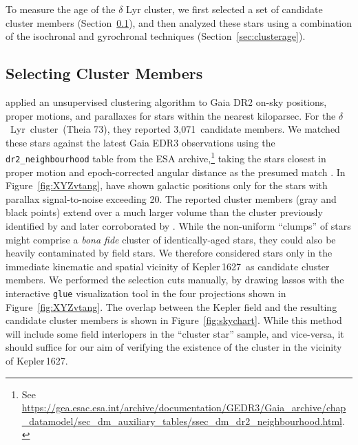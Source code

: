 \documentclass[12pt,modern,twocolumn,tighten]{aastex63}
\newcommand{\cn}{$\delta$\ Lyr\ cluster} %
\newcommand{\sn}{Kepler\,1627} %
\newcommand{\noriginal}{3{,}071} %
\begin{document}
To measure the age of the $\delta$ Lyr cluster, we first selected a
set of candidate cluster members
(Section~\ref{sec:kinematicselection}), and then analyzed these stars
using a combination of the isochronal and gyrochronal techniques
(Section~\ref{sec:clusterage}).


\subsection{Selecting Cluster Members}
\label{sec:kinematicselection}

\citet{KounkelCovey2019} applied an unsupervised clustering algorithm
to Gaia DR2 on-sky positions, proper motions, and parallaxes for stars
within the nearest kiloparsec.  For the \cn\ (Theia 73), they reported
\noriginal\ candidate members.  We matched these stars against the
latest Gaia EDR3 observations using the \texttt{dr2\_neighbourhood}
table from the ESA archive,\footnote{See
\url{https://gea.esac.esa.int/archive/documentation/GEDR3/Gaia_archive/chap_datamodel/sec_dm_auxiliary_tables/ssec_dm_dr2_neighbourhood.html}.}
taking the stars closest in proper motion and epoch-corrected angular
distance as the presumed match \citep{gaia_collaboration_2021_edr3}.
In Figure~\ref{fig:XYZvtang}, have shown galactic positions only for
the stars with parallax signal-to-noise exceeding 20.  The reported
cluster members (gray and black points) extend over a much larger
volume than the cluster previously identified by
\citet{stephenson_possible_1959} and later corroborated by
\citet{eggen_photometric_1968}.  While the non-uniform ``clumps'' of
stars might comprise a {\it bona fide} cluster of identically-aged
stars, they could also be heavily contaminated by field stars.  We
therefore considered stars only in the immediate kinematic and spatial
vicinity of \sn\ as candidate cluster members.  We performed the
selection cuts manually, by drawing lassos with the interactive
\texttt{glue} visualization tool \citep{beaumont_2014_13866} in the
four projections shown in Figure~\ref{fig:XYZvtang}.  The overlap
between the Kepler field and the resulting candidate cluster members
is shown in Figure~\ref{fig:skychart}.  While this method will include
some field interlopers in the ``cluster star'' sample, and vice-versa,
it should suffice for our aim of verifying the existence of the
cluster in the vicinity of \sn.
\end{document}

